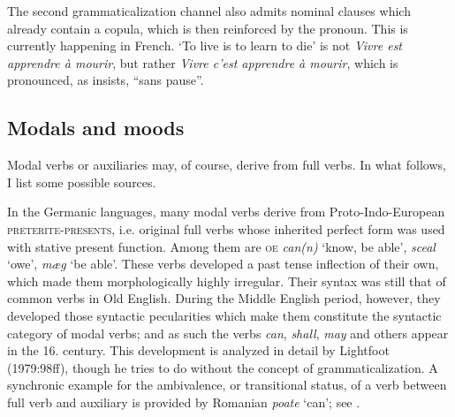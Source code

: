 The second grammaticalization channel also admits nominal clauses which already contain a copula, which is then reinforced by the pronoun. This is currently happening in French. ‘To live is to learn to die’ is not \textit{Vivre est apprendre à mourir}, but rather \textit{Vivre c'est apprendre à mourir}, which is pronounced, as \citet[72]{Frei1929} insists, “sans pause”.

\subsection{Modals and moods}\label{sec:3.1.3}

Modal verbs or auxiliaries may, of course, derive from full verbs. In what follows, I list some possible sources.

\label{page30}In the Germanic languages, many modal verbs derive from Proto-Indo-European \textsc{preterite-presents}, i.e. original full verbs whose inherited perfect form was used with stative present function. Among them are \textsc{oe} \textit{can(n)} ‘know, be able’, \textit{sceal} ‘owe’, \textit{mæg} ‘be able’. These verbs developed a past tense inflection of their own, which made them morphologically highly irregular. Their syntax was still that of common verbs in Old English. During the Middle English period, however, they developed those syntactic pecularities which make them constitute the syntactic category of modal verbs; and as such the verbs \textit{can}, \textit{shall}, \textit{may} and others appear in the 16. century. This development is analyzed in detail by Lightfoot (1979:98ff), though he tries to do without the concept of grammaticalization. A synchronic example for the ambivalence, or transitional status, of a verb between full verb and auxiliary is provided by Romanian \textit{poate} ‘can’; see \citet[198f]{MallinsonEtAl1981}.

